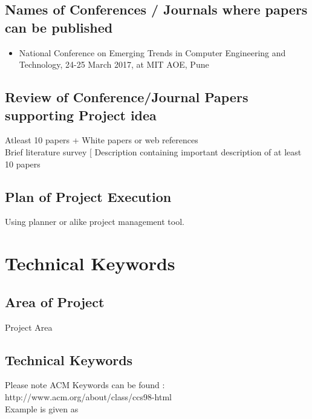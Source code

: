\documentclass[12pt,a4paper]{article}
\begin{document}
\subsection{Names of Conferences / Journals where papers can be published}
\begin{itemize}
\item  National Conference on Emerging Trends in Computer Engineering and Technology, 24-25 March 2017, at MIT AOE, Pune
\end{itemize}


\subsection{Review of Conference/Journal Papers supporting Project idea}
\label{sec:survey}
   Atleast 10 papers + White papers or web references\\
   Brief literature survey [ Description containing important description of at least 10 papers

\subsection{Plan of Project Execution}
  Using planner or alike project management tool.


\newpage
\section{Technical Keywords}
\setcounter{section}{2}

\subsection{Area of Project}
Project Area

\subsection{Technical Keywords}
Please note ACM Keywords can be found : http://www.acm.org/about/class/ccs98-html \\
Example is given as
\end{document}
